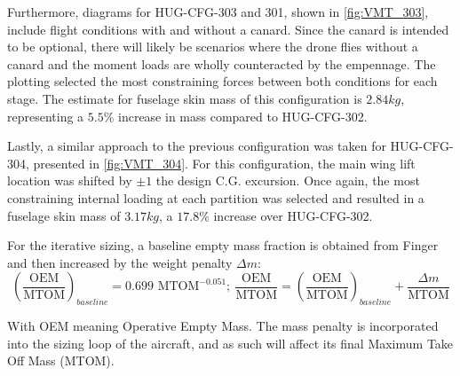 Furthermore, diagrams for HUG-CFG-303 and 301, shown in \autoref{fig:VMT_303}, include flight conditions with and without a canard. Since the canard is intended to be optional, there will likely be scenarios where the drone flies without a canard and the moment loads are wholly counteracted by the empennage. The plotting selected the most constraining forces between both conditions for each stage. The estimate for fuselage skin mass of this configuration is $2.84kg$, representing a $5.5\%$ increase in mass compared to HUG-CFG-302.

Lastly, a similar approach to the previous configuration was taken for HUG-CFG-304, presented in \autoref{fig:VMT_304}. For this configuration, the main wing lift location was shifted by $\pm 1$ the design C.G. excursion. Once again, the most constraining internal loading at each partition was selected and resulted in a fuselage skin mass of $3.17kg$, a $17.8\%$ increase over HUG-CFG-302.

For the iterative sizing, a baseline empty mass fraction is obtained from Finger \cite{Finger2016VTOL} and then increased by the weight penalty $\Delta m$:
\begin{equation}
    \left(\frac{\text{OEM}}{\text{MTOM}}\right)_{baseline}=0.699\text{ MTOM}^{-0.051};\ \frac{\text{OEM}}{\text{MTOM}}=\left(\frac{\text{OEM}}{\text{MTOM}}\right)_{baseline}+\frac{\Delta m}{\text{MTOM}}
\end{equation}

With OEM meaning Operative Empty Mass. The mass penalty is incorporated into the sizing loop of the aircraft, and as such will affect its final Maximum Take Off Mass (MTOM).

